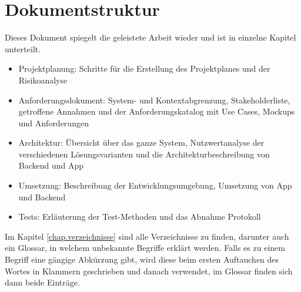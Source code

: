 \section{Dokumentstruktur}\label{nicht_ziele}
Dieses Dokument spiegelt die geleistete Arbeit wieder und ist in einzelne Kapitel unterteilt.
\begin{itemize}
\item Projektplanung: Schritte für die Erstellung des Projektplanes und der Risikoanalyse
\item Anforderungsdokument: System- und Kontextabgrenzung, Stakeholderliste, getroffene Annahmen und der Anforderungskatalog mit Use Cases, Mockups und Anforderungen
\item Architektur: Übersicht über das ganze System, Nutzwertanalyse der verschiedenen Lösungsvarianten und die Architekturbeschreibung von Backend und App
\item Umsetzung: Beschreibung der Entwicklungsumgebung, Umsetzung von App und Backend
\item Tests: Erläuterung der Test-Methoden und das Abnahme Protokoll
\end{itemize}

Im Kapitel \ref{chap.verzeichnisse} sind alle Verzeichnisse zu finden, darunter auch ein Glossar, in welchem unbekannte Begriffe erklärt werden. Falls es zu einem Begriff eine gängige Abkürzung gibt, wird diese beim ersten Auftauchen des Wortes in Klammern geschrieben und danach verwendet, im Glossar finden sich dann beide Einträge.
